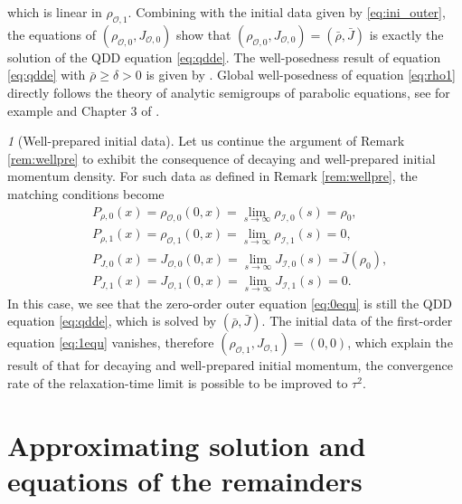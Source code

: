 \documentclass[english]{amsart}
\theoremstyle{plain}
\theoremstyle{definition}
\theoremstyle{remark}
\newtheorem{rem}[thm]{\protect\remarkname}
\theoremstyle{plain}
\theoremstyle{plain}
\theoremstyle{plain}
\providecommand{\remarkname}{Remark}
\numberwithin{equation}{section}
\begin{document}
which is linear in $\rho_{\mathcal{O},1}$. Combining with the initial data given by \eqref{eq:ini_outer}, the equations of $(\rho_{\mathcal{O},0},J_{\mathcal{O},0})$ show that $(\rho_{\mathcal{O},0},J_{\mathcal{O},0})=(\bar\rho,\bar J)$ is exactly the solution of the QDD equation \eqref{eq:qdde}. The well-posedness result of equation \eqref{eq:qdde} with $\bar\rho\geq\delta>0$ is given by \cite{AMZ3}. Global well-posedness of equation \eqref{eq:rho1} directly follows the theory of analytic semigroups of parabolic equations, see for example \cite{St} and Chapter 3 of \cite{Lu}.

\begin{rem}[Well-prepared initial data]
Let us continue the argument of Remark \ref{rem:wellpre} to exhibit the consequence of decaying and well-prepared initial momentum density. For such data as defined in Remark \ref{rem:wellpre}, the matching conditions become
\begin{align*}
&P_{\rho,0}(x)=\rho_{\mathcal{O},0}(0,x)=\lim_{s\to\infty}\rho_{\mathcal{I},0}(s)=\rho_0,\\
&P_{\rho,1}(x)=\rho_{\mathcal{O},1}(0,x)=\lim_{s\to\infty}\rho_{\mathcal{I},1}(s)=0,\\
&P_{J,0}(x)=J_{\mathcal{O},0}(0,x)=\lim_{s\to\infty}J_{\mathcal{I},0}(s)=\bar{J}(\rho_0),\\
&P_{J,1}(x)=J_{\mathcal{O},1}(0,x)=\lim_{s\to\infty}J_{\mathcal{I},1}(s)=0.
\end{align*}
In this case, we see that the zero-order outer equation \eqref{eq:0equ} is still the QDD equation \eqref{eq:qdde}, which is solved by $(\bar\rho,\bar J)$. The initial data of the first-order equation \eqref{eq:1equ} vanishes, therefore $(\rho_{\mathcal{O},1},J_{\mathcal{O},1})=(0,0)$, which explain the result of \cite{LT} that for decaying and well-prepared initial momentum, the convergence rate of the relaxation-time limit is possible to be improved to $\tau^2$. 
\end{rem}

  

\section{Approximating solution and equations of the remainders}\label{sect:remainder}
\end{document}
